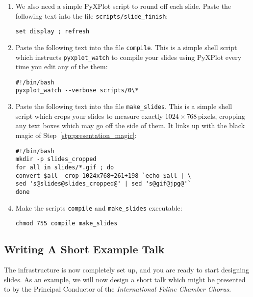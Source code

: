 \begin{enumerate}
\item We also need a simple PyXPlot script to round off each slide. Paste the
following text into the file {\tt scripts/slide\_finish}:
\begin{verbatim}
set display ; refresh
\end{verbatim}
\item Paste the following text into the file {\tt compile}. This is a simple
shell script which instructs {\tt pyxplot\_watch} to compile your slides using
PyXPlot every time you edit any of the them:
\begin{verbatim}
#!/bin/bash
pyxplot_watch --verbose scripts/0\*
\end{verbatim}
\item Paste the following text into the file {\tt make\_slides}. This is a
simple shell script which crops your slides to measure exactly
$1024\times768$\,pixels, cropping any text boxes which may go off the side of
them. It links up with the black magic of Step~\ref{stp:presentation_magic}:
\begin{verbatim}
#!/bin/bash
mkdir -p slides_cropped
for all in slides/*.gif ; do
convert $all -crop 1024x768+261+198 `echo $all | \
sed 's@slides@slides_cropped@' | sed 's@gif@jpg@'`
done
\end{verbatim}
\item Make the scripts {\tt compile} and {\tt make\_slides} executable:
\begin{verbatim}
chmod 755 compile make_slides
\end{verbatim}
\end{enumerate}

\subsection{Writing A Short Example Talk}

The infrastructure is now completely set up, and you are ready to start
designing slides. As an example, we will now design a short talk which might be
presented to by the Principal Conductor of the {\it International Feline
Chamber Chorus}.

